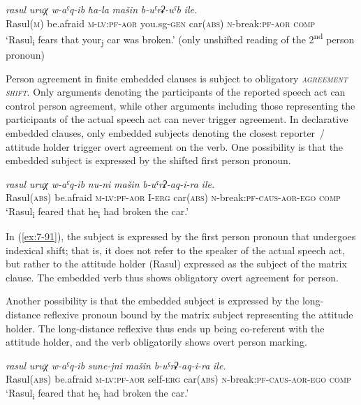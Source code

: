 ﻿\documentclass[output=paper]{langsci/langscibook}
\begin{document}
\ex %
\gll \emph{rasul} \emph{uruχ} \emph{w-aˤq-ib} \emph{ħa-la} \emph{mašin} \emph{b-uˤrʡ-uˤb} \emph{ile.}\\
Rasul(\textsc{m}) be.afraid \textsc{m}-\textsc{lv}:\textsc{pf}-\textsc{aor} you.sg-\textsc{gen} car(\textsc{abs}) \textsc{n}-break:\textsc{pf}-\textsc{aor} \textsc{comp}\\
\glt `Rasul\textsubscript{i} fears that your\textsubscript{j} car was
broken.' (only unshifted reading of the 2\textsuperscript{nd} person
pronoun)
\z


Person agreement in finite embedded clauses is subject to obligatory
\emph{\textsc{agreement shift}}. Only arguments denoting the
participants of the reported speech act can control person agreement,
while other arguments including those representing the participants of
the actual speech act can never trigger agreement. In declarative
embedded clauses, only embedded subjects denoting the closest reporter~/
attitude holder trigger overt agreement on the verb. One possibility is
that the embedded subject is expressed by the shifted first person
pronoun.

\ea \label{ex:7-91}
\gll \emph{rasul} \emph{uruχ} \emph{w-aˤq-ib} \emph{nu-ni} \emph{mašin} \emph{b-uˤrʡ-aq-i-ra} \emph{ile.}\\
Rasul(\textsc{abs}) be.afraid \textsc{m}-\textsc{lv}:\textsc{pf}-\textsc{aor} I-\textsc{erg} car(\textsc{abs}) \textsc{n}-break:\textsc{pf}-\textsc{caus}-\textsc{aor}-\textsc{ego} \textsc{comp}\\
\glt `Rasul\textsubscript{i} feared that he\textsubscript{i} had broken the car.'
\z

In (\ref{ex:7-91}), the subject is expressed by the first person pronoun that
undergoes indexical shift; that is, it does not refer to the speaker of
the actual speech act, but rather to the attitude holder (Rasul)
expressed as the subject of the matrix clause. The embedded verb thus
shows obligatory overt agreement for person.

Another possibility is that the embedded subject is expressed by the
long-distance reflexive pronoun bound by the matrix subject representing
the attitude holder. The long-distance reflexive thus ends up being
co-referent with the attitude holder, and the verb obligatorily shows
overt person marking.

\ea\label{ex:7-92}
\gll \emph{rasul} \emph{uruχ} \emph{w-aˤq-ib} \emph{sune-jni} \emph{mašin} \emph{b-uˤrʡ-aq-i-ra} \emph{ile.}\\
Rasul(\textsc{abs}) be.afraid \textsc{m}-\textsc{lv}:\textsc{pf}-\textsc{aor} self-\textsc{erg} car(\textsc{abs}) \textsc{n}-break:\textsc{pf}-\textsc{caus}-\textsc{aor}-\textsc{ego} \textsc{comp}\\
\glt `Rasul\textsubscript{i} feared that he\textsubscript{i} had broken the car.'
\z
\end{document}
